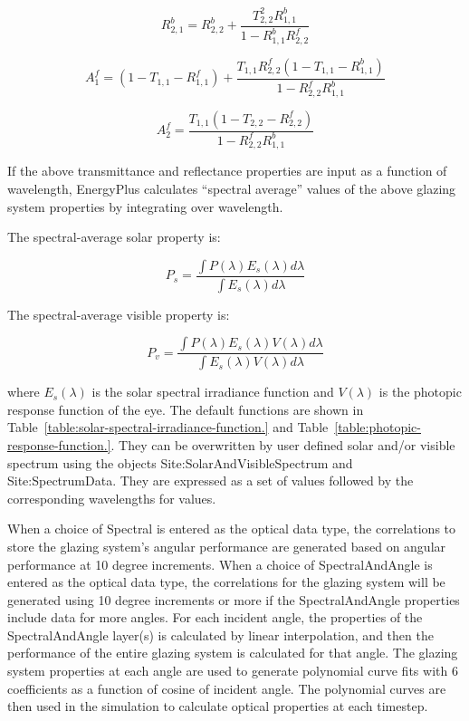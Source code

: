 \begin{equation}
R_{2,1}^b = R_{2,2}^b + \frac{{T_{2,2}^2R_{1,1}^b}}{{1 - R_{1,1}^bR_{2,2}^f}}
\end{equation}

\begin{equation}
A_1^f = (1 - {T_{1,1}} - R_{1,1}^f) + \frac{{{T_{1,1}}R_{2,2}^f(1 - {T_{1,1}} - R_{1,1}^b)}}{{1 - R_{2,2}^fR_{1,1}^b}}
\end{equation}

\begin{equation}
A_2^f = \frac{{{T_{1,1}}(1 - {T_{2,2}} - R_{2,2}^f)}}{{1 - R_{2,2}^fR_{1,1}^b}}
\end{equation}

If the above transmittance and reflectance properties are input as a function of wavelength, EnergyPlus calculates ``spectral average'' values of the above glazing system properties by integrating over wavelength.

The spectral-average solar property is:

\begin{equation}
{P_s} = \frac{{\int {P(\lambda ){E_s}(\lambda )d\lambda } }}{{\int {{E_s}(\lambda )d\lambda } }}
\end{equation}

The spectral-average visible property is:

\begin{equation}
{P_v} = \frac{{\int {P(\lambda ){E_s}(\lambda )V(\lambda )d\lambda } }}{{\int {{E_s}(\lambda )V(\lambda )d\lambda } }}
\end{equation}

where \({E_s}(\lambda )\) is the solar spectral irradiance function and \(V(\lambda )\) is the photopic response function of the eye. The default functions are shown in Table~\ref{table:solar-spectral-irradiance-function.} and Table~\ref{table:photopic-response-function.}. They can be overwritten by user defined solar and/or visible spectrum using the objects Site:SolarAndVisibleSpectrum and Site:SpectrumData. They are expressed as a set of values followed by the corresponding wavelengths for values.

When a choice of Spectral is entered as the optical data type, the correlations to store the glazing system's angular performance are generated based on angular performance at 10 degree increments. When a choice of SpectralAndAngle is entered as the optical data type, the correlations for the glazing system will be generated using 10 degree increments or more if the SpectralAndAngle properties include data for more angles.  For each incident angle, the properties of the SpectralAndAngle layer(s) is calculated by linear interpolation, and then the performance of the entire glazing system is calculated for that angle.  The glazing system properties at each angle are used to generate polynomial curve fits with 6 coefficients as a function of cosine of incident angle. The polynomial curves are then used in the simulation to calculate optical properties at each timestep.

